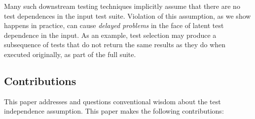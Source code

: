 Many such downstream testing techniques implicitly assume that
there are no test dependences in the input test suite.  Violation of
this assumption, as we show happens in practice, can cause \emph{delayed problems} in the face
of latent test dependence in the input.  As an
example, test selection may produce a subsequence of tests that do not
return the same results as they do when executed originally, as part of the full suite.


\subsection{Contributions}
\label{sec:contributions}

This paper addresses and questions
conventional wisdom about the test independence assumption. 
This paper makes the following contributions:

